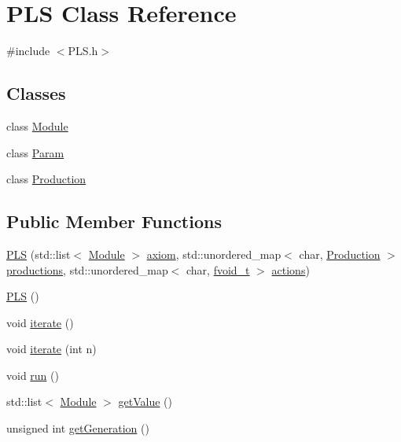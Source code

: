 \hypertarget{class_p_l_s}{}\section{P\+LS Class Reference}
\label{class_p_l_s}


{\ttfamily \#include $<$P\+L\+S.\+h$>$}

\subsection*{Classes}
\begin{DoxyCompactItemize}
\item 
class \hyperlink{class_p_l_s_1_1_module}{Module}
\item 
class \hyperlink{class_p_l_s_1_1_param}{Param}
\item 
class \hyperlink{class_p_l_s_1_1_production}{Production}
\end{DoxyCompactItemize}
\subsection*{Public Member Functions}
\begin{DoxyCompactItemize}
\item 
\hyperlink{class_p_l_s_a47c6fa2278f0d4a2f885484950211a5b}{P\+LS} (std\+::list$<$ \hyperlink{class_p_l_s_1_1_module}{Module} $>$ \hyperlink{class_p_l_s_a5de46c72cd9ef4006f7f1ed43ac028c1}{axiom}, std\+::unordered\+\_\+map$<$ char, \hyperlink{class_p_l_s_1_1_production}{Production} $>$ \hyperlink{class_p_l_s_a2bdf324e0d0ed4e1c3265d4029f83f0b}{productions}, std\+::unordered\+\_\+map$<$ char, \hyperlink{class_p_l_s_a2c9371dd235f3c41295d15c92ac9f33b}{fvoid\+\_\+t} $>$ \hyperlink{class_p_l_s_a5d7bf41cb569c111be4899bd7904a0da}{actions})
\item 
\hyperlink{class_p_l_s_a99f207f5849c3c1420da017e611d415a}{P\+LS} ()
\item 
void \hyperlink{class_p_l_s_a62156c4202b8cd20d4ba37306a57af87}{iterate} ()
\item 
void \hyperlink{class_p_l_s_ac87b2a52213e0e0a7fd0bcb969a68f8d}{iterate} (int n)
\item 
void \hyperlink{class_p_l_s_a72c26ad73b282abac9137978dcff21cb}{run} ()
\item 
std\+::list$<$ \hyperlink{class_p_l_s_1_1_module}{Module} $>$ \hyperlink{class_p_l_s_a26085d4c74f3ccddd6241cc9548e0d2a}{get\+Value} ()
\item 
unsigned int \hyperlink{class_p_l_s_aed7eff9d6f21452608d9f007f7ddaf26}{get\+Generation} ()
\end{DoxyCompactItemize}
